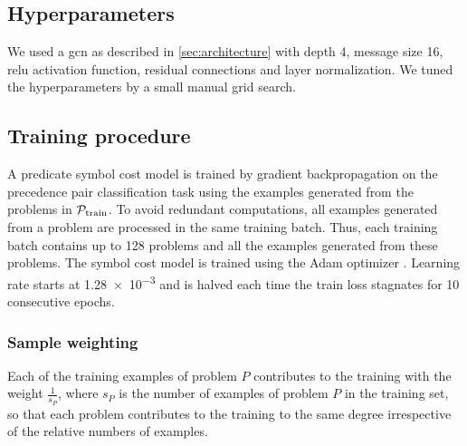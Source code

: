 \subsection{Hyperparameters}

We used a \gls{gcn} as described in \cref{sec:architecture}
with depth 4, message size 16, \gls{relu} activation function,
residual connections and layer normalization.
We tuned the hyperparameters by a small manual grid search.

\subsection{Training procedure}

A predicate symbol cost model is trained by gradient backpropagation
on the precedence pair classification task
using the examples generated from the problems in $\operatorname{\mathcal{P}_{\mathrm{train}}}$.
To avoid redundant computations, all examples generated from a problem are processed in the same training batch.
Thus, each training batch contains up to \num{128} problems and all the examples generated from these problems.
The symbol cost model is trained using the Adam optimizer \cite{Kingma2014}.
Learning rate starts at \num{1.28e-3}
and is halved each time the train loss stagnates for 10 consecutive epochs.

\subsubsection{Sample weighting}
Each of the training examples of problem $P$ contributes to the training with the weight $\frac{1}{s_P}$,
where $s_P$ is the number of examples of problem $P$ in the training set,
so that each problem contributes to the training to the same degree irrespective of the relative numbers of examples.

